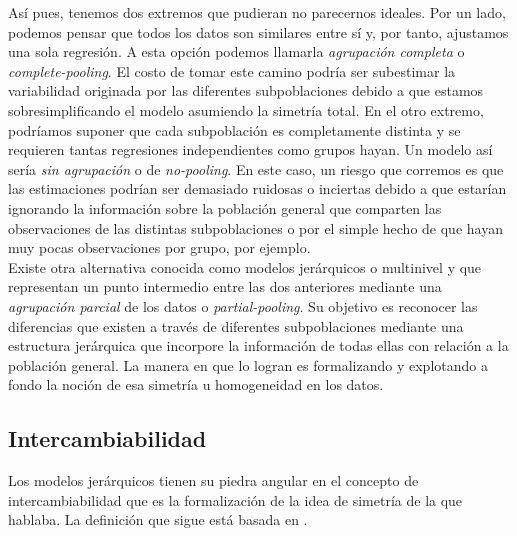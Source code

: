 Así pues, tenemos dos extremos que pudieran no parecernos ideales. Por un lado, podemos pensar que todos los datos son similares entre sí y, por tanto, ajustamos una sola regresión. A esta opción podemos llamarla \textit{agrupación completa} o \textit{complete-pooling}. El costo de tomar este camino podría ser subestimar la variabilidad originada por las diferentes subpoblaciones debido a que estamos sobresimplificando el modelo asumiendo la simetría total. En el otro extremo, podríamos suponer que cada subpoblación es completamente distinta y se requieren tantas regresiones independientes como grupos hayan. Un modelo así sería \textit{sin agrupación} o de \textit{no-pooling}. En este caso, un riesgo que corremos es que las estimaciones podrían ser demasiado ruidosas o inciertas debido a que estarían ignorando la información sobre la población general que comparten las observaciones de las distintas subpoblaciones o por el simple hecho de que hayan muy pocas observaciones por grupo, por ejemplo.\\ 

Existe otra alternativa conocida como modelos jerárquicos o multinivel y que representan un punto intermedio entre las dos anteriores mediante una \textit{agrupación parcial} de los datos o \textit{partial-pooling}. Su objetivo es reconocer las diferencias que existen a través de diferentes subpoblaciones mediante una estructura jerárquica que incorpore la información de todas ellas con relación a la población general. La manera en que lo logran es formalizando y explotando a fondo la noción de esa simetría u homogeneidad en los datos.  

\subsection{Intercambiabilidad}

Los modelos jerárquicos tienen su piedra angular en el concepto de intercambiabilidad que es la formalización de la idea de simetría de la que hablaba. La definición que sigue está basada en \textcite[169-171,Definiciones 4.2 y 4.3]{BernardoSmith00}.\\ 


